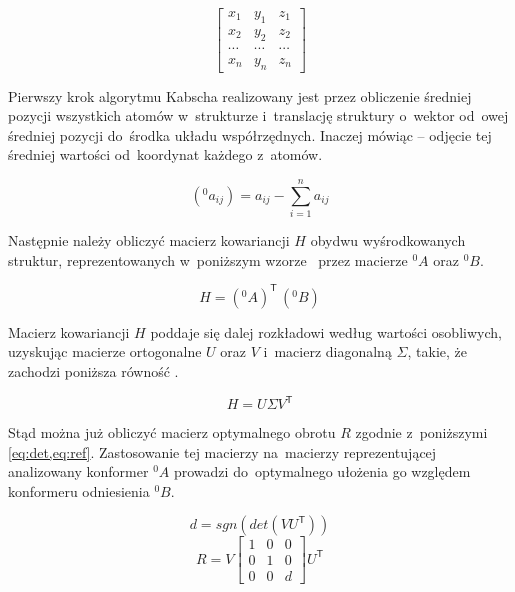 \begin{equation}
  \begin{bmatrix}
    x_1 & y_1 & z_1\\
    x_2 & y_2 & z_2\\
    \cdots & \cdots & \cdots \\
    x_n & y_n & z_n
  \end{bmatrix}
\end{equation}

Pierwszy krok algorytmu Kabscha realizowany jest przez obliczenie średniej pozycji
  wszystkich atomów w~strukturze i~translację struktury o~wektor od~owej średniej pozycji
  do~środka układu współrzędnych.
Inaczej mówiąc \--- odjęcie tej średniej wartości od~koordynat każdego z~atomów.

\begin{equation}
  (^0a_{ij}) = a_{ij} - \sum\limits^n_{i=1}a_{ij}
\end{equation}

Następnie należy obliczyć macierz kowariancji $H$ obydwu wyśrodkowanych struktur,
  reprezentowanych w~poniższym wzorze~ przez macierze $^0\!A$ oraz $^0B$.

\begin{equation}\label{eq:cov}
  H = (^0\!A)^\mathsf{T}\,(^0B)
\end{equation}

Macierz kowariancji $H$ poddaje się dalej rozkładowi według wartości osobliwych, uzyskując
  macierze ortogonalne $U$ oraz $V$ i~macierz diagonalną $\varSigma$, takie, że zachodzi
  poniższa równość .

\begin{equation}\label{eq:svd}
  H = U\varSigma{}V^\mathsf{T}
\end{equation}

Stąd można już obliczyć macierz optymalnego obrotu $R$ zgodnie z~poniższymi \cref{eq:det,eq:ref}.
Zastosowanie tej macierzy na~macierzy reprezentującej analizowany konformer $^0\!A$ prowadzi
  do~optymalnego ułożenia go względem konformeru odniesienia $^0B$.

\begin{equation}\label{eq:det}
  d = sgn(det(VU^\mathsf{T}))
\end{equation}
\begin{equation}\label{eq:rot}
  R = V \begin{bmatrix}
    1 & 0 & 0 \\
    0 & 1 & 0 \\
    0 & 0 & d
  \end{bmatrix} U^\mathsf{T}
\end{equation}

